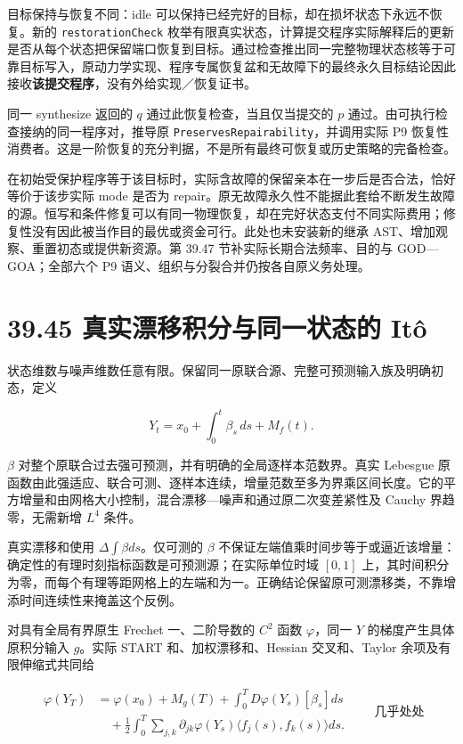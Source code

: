 \documentclass[
  11pt,
  oneside]{book}
\begin{document}
目标保持与恢复不同：idle 可以保持已经完好的目标，却在损坏状态下永远不恢复。新的 \nolinkurl{restorationCheck} 枚举有限真实状态，计算提交程序实际解释后的更新是否从每个状态把保留端口恢复到目标。通过检查推出同一完整物理状态核等于可靠目标写入，原动力学实现、程序专属恢复盆和无故障下的最终永久目标结论因此接收\textbf{该提交程序}，没有外给实现／恢复证书。

同一 synthesize 返回的 \(q\) 通过此恢复检查，当且仅当提交的 \(p\) 通过。由可执行检查接纳的同一程序对，推导原 \nolinkurl{PreservesRepairability}，并调用实际 P9 恢复性消费者。这是一阶恢复的充分判据，不是所有最终可恢复或历史策略的完备检查。

在初始受保护程序等于该目标时，实际含故障的保留亲本在一步后是否合法，恰好等价于该步实际 mode 是否为 repair。原无故障永久性不能据此套给不断发生故障的源。恒写和条件修复可以有同一物理恢复，却在完好状态支付不同实际费用；修复性没有因此被当作目的最优或资金可行。此处也未安装新的继承 AST、增加观察、重置初态或提供新资源。第 39.47 节补实际长期合法频率、目的与 GOD---GOA；全部六个 P9 语义、组织与分裂合并仍按各自原义务处理。

\section{39.45 真实漂移积分与同一状态的 Itô}\label{ux771fux5b9eux6f02ux79fbux79efux5206ux4e0eux540cux4e00ux72b6ux6001ux7684-ituxf4}

状态维数与噪声维数任意有限。保留同一原联合源、完整可预测输入族及明确初态，定义

\[Y_t=x_0+\int_0^t\beta_s\,ds+M_f(t).\]

\(\beta\) 对整个原联合过去强可预测，并有明确的全局逐样本范数界。真实 Lebesgue 原函数由此强适应、联合可测、逐样本连续，增量范数至多为界乘区间长度。它的平方增量和由网格大小控制，混合漂移---噪声和通过原二次变差紧性及 Cauchy 界趋零，无需新增 \(L^4\) 条件。

真实漂移和使用 \(\Delta\int\beta ds\)。仅可测的 \(\beta\) 不保证左端值乘时间步等于或逼近该增量：确定性的有理时刻指标函数是可预测源；在实际单位时域 \([0,1]\) 上，其时间积分为零，而每个有理等距网格上的左端和为一。正确结论保留原可测漂移类，不靠增添时间连续性来掩盖这个反例。

对具有全局有界原生 Frechet 一、二阶导数的 \(C^2\) 函数 \(\varphi\)，同一 \(Y\) 的梯度产生具体原积分输入 \(g\)。实际 START 和、加权漂移和、Hessian 交叉和、Taylor 余项及有限伸缩式共同给

\[\begin{aligned}
\varphi(Y_T)&=\varphi(x_0)+M_g(T)+\int_0^T D\varphi(Y_s)[\beta_s]ds\\
&\quad+\frac12\int_0^T\sum_{j,k}\partial_{jk}\varphi(Y_s)
\langle f_j(s),f_k(s)\rangle ds.
\end{aligned}
\qquad\text{几乎处处}\]
\end{document}
